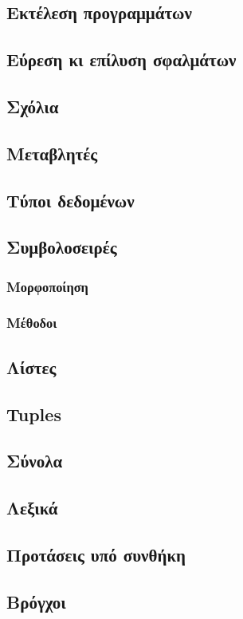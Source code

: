 \documentclass[a4paper,14pt]{extreport}
\begin{document}
\subsection{Εκτέλεση προγραμμάτων}
\subsection{Εύρεση κι επίλυση σφαλμάτων}
\subsection{Σχόλια}
\subsection{Μεταβλητές}
\subsection{Τύποι δεδομένων}
\subsection{Συμβολοσειρές}
\subsubsection{Μορφοποίηση}
\subsubsection{Μέθοδοι}
\subsection{Λίστες}
\subsection{Tuples}
\subsection{Σύνολα}
\subsection{Λεξικά}
\subsection{Προτάσεις υπό συνθήκη}
\subsection{Βρόγχοι}
\end{document}
